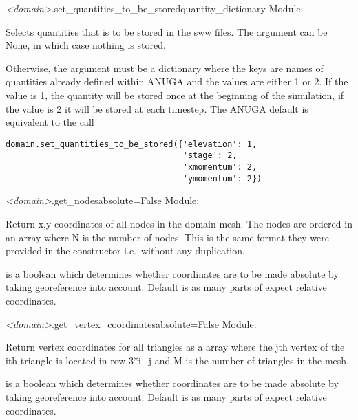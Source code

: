\documentclass{manual}
\begin{document}
\begin{methoddesc}{\emph{<domain>}.set_quantities_to_be_stored}{quantity_dictionary}
Module: 

Selects quantities that is to be stored in the sww files.
The argument can be None, in which case nothing is stored.

Otherwise, the argument must be a dictionary where the keys are names of quantities
already defined within ANUGA and the values are either 1 or 2. If the value is 1, the quantity
will be stored once at the beginning of the simulation, if the value is 2 it will be stored
at each timestep. The ANUGA default is equivalent to the call
\begin{verbatim}
domain.set_quantities_to_be_stored({'elevation': 1,
                                    'stage': 2,
                                    'xmomentum': 2,
                                    'ymomentum': 2})
\end{verbatim}
\end{methoddesc}


\begin{methoddesc}{\emph{<domain>}.get_nodes}{absolute=False}
Module: 

Return x,y coordinates of all nodes in the domain mesh.  The nodes are ordered
in an  array where N is the number of nodes.  This is the same format
they were provided in the constructor i.e.\ without any duplication.

 is a boolean which determines whether coordinates
are to be made absolute by taking georeference into account.
Default is  as many parts of \anuga expect relative coordinates.
\end{methoddesc}

\begin{methoddesc}{\emph{<domain>}.get_vertex_coordinates}{absolute=False}
Module: 

\label{pg:get vertex coordinates}
Return vertex coordinates for all triangles as a  array
where the jth vertex of the ith triangle is located in row 3*i+j and
M is the number of triangles in the mesh.

 is a boolean which determines whether coordinates
are to be made absolute by taking georeference into account.
Default is  as many parts of \anuga expect relative coordinates.
\end{methoddesc}
\end{document}
